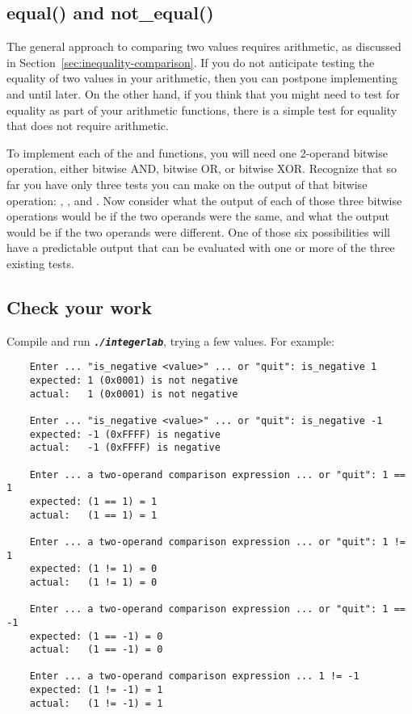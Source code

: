 \subsection{equal() and not\_equal()}

The general approach to comparing two values requires arithmetic, as discussed in Section~\ref{sec:inequality-comparison}.
If you do not anticipate testing the equality of two values in your arithmetic, then you can postpone implementing  and  until later.
On the other hand, if you think that you might need to test for equality as part of your arithmetic functions, there is a simple test for equality that does not require arithmetic.

To implement each of the  and  functions, you will need one 2-operand bitwise operation, either bitwise AND, bitwise OR, or bitwise XOR\@.
Recognize that so far you have only three tests you can make on the output of that bitwise operation: , , and .
Now consider what the output of each of those three bitwise operations would be if the two operands were the same, and what the output would be if the two operands were different.
One of those six possibilities will have a predictable output that can be evaluated with one or more of the three existing tests.


\subsection*{Check your work}

    Compile and run \texttt{\textbf{\textit{./integerlab}}}, trying a few values.
    For example:
    \begin{verbatim}
    Enter ... "is_negative <value>" ... or "quit": is_negative 1
    expected: 1 (0x0001) is not negative
    actual:   1 (0x0001) is not negative

    Enter ... "is_negative <value>" ... or "quit": is_negative -1
    expected: -1 (0xFFFF) is negative
    actual:   -1 (0xFFFF) is negative

    Enter ... a two-operand comparison expression ... or "quit": 1 == 1
    expected: (1 == 1) = 1
    actual:   (1 == 1) = 1

    Enter ... a two-operand comparison expression ... or "quit": 1 != 1
    expected: (1 != 1) = 0
    actual:   (1 != 1) = 0

    Enter ... a two-operand comparison expression ... or "quit": 1 == -1
    expected: (1 == -1) = 0
    actual:   (1 == -1) = 0

    Enter ... a two-operand comparison expression ... 1 != -1
    expected: (1 != -1) = 1
    actual:   (1 != -1) = 1
\end{verbatim}

